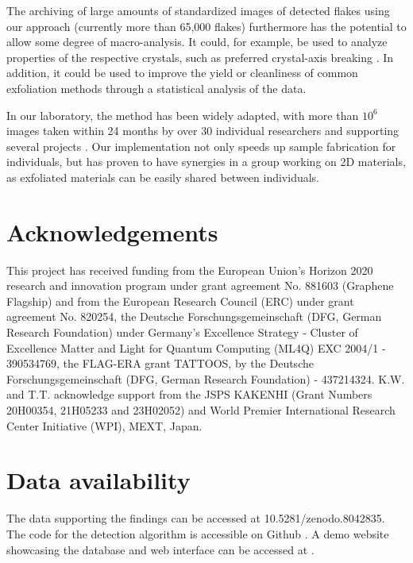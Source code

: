 \documentclass[reprint, prl, superscriptaddress, floatfix]{revtex4-2}
\begin{document}
The archiving of large amounts of standardized images of detected flakes using our approach (currently more than 65,000 flakes) furthermore has the potential to allow some degree of macro-analysis. 
It could, for example, be used to analyze properties of the respective crystals, such as preferred crystal-axis breaking \cite{Han2020Jul}. 
In addition, it could be used to improve the yield or cleanliness of common exfoliation methods through a statistical analysis of the data. 

In our laboratory, the method has been widely adapted, with more than $10^6$ images taken within 24 months by over 30 individual researchers and supporting several projects \cite{Wirth2022, Tebbe2023, Ouaj2023}. 
Our implementation not only speeds up sample fabrication for individuals, but has proven to have synergies in a group working on 2D materials, as exfoliated materials can be easily shared between individuals. 
    
\section{Acknowledgements}
This project has received funding from the European Union’s Horizon 2020 research and innovation program under grant agreement No. 881603 (Graphene Flagship) and from the European Research Council (ERC) under grant agreement No. 820254, the Deutsche Forschungsgemeinschaft (DFG, German Research Foundation) under Germany’s Excellence Strategy - Cluster of Excellence Matter and Light for Quantum Computing (ML4Q) EXC 2004/1 - 390534769, the FLAG-ERA grant TATTOOS, by the Deutsche Forschungsgemeinschaft (DFG, German Research Foundation) - 437214324. 
K.W. and T.T. acknowledge support from the JSPS KAKENHI (Grant Numbers 20H00354, 21H05233 and 23H02052) and World Premier International Research Center Initiative (WPI), MEXT, Japan.
 
\section{Data availability}
The data supporting the findings can be accessed at 10.5281/zenodo.8042835.
The code for the detection algorithm is accessible on Github \cite{code}.
A demo website showcasing the database and web interface can be accessed at \cite{website}.


\end{document}
